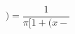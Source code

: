 \documentclass[preview]{standalone}
\begin{document}
\begin{align*}
)=\dfrac{1}{\pi[1+(x-}
\end{align*}
\end{document}
